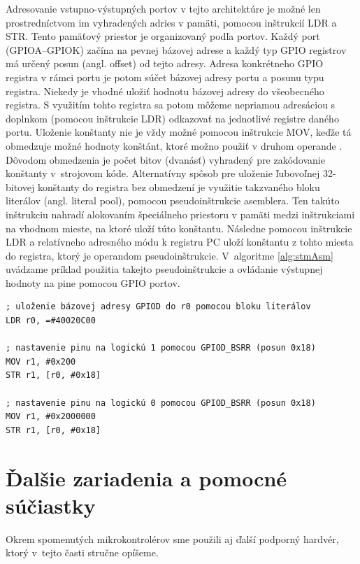 Adresovanie vstupno-výstupných portov v tejto architektúre je možné len prostredníctvom im vyhradených adries v pamäti, pomocou inštrukcií LDR a STR. Tento pamäťový priestor je organizovaný podľa portov. Každý port (GPIOA--GPIOK) začína na pevnej bázovej adrese a každý typ GPIO registrov má určený posun (angl. offset) od tejto adresy. Adresa konkrétneho GPIO registra v rámci portu je potom súčet bázovej adresy portu a posunu typu registra. Niekedy je vhodné uložiť hodnotu bázovej adresy do všeobecného registra. S využitím tohto registra sa potom môžeme nepriamou adresáciou s doplnkom (pomocou inštrukcie LDR) odkazovať na jednotlivé registre daného portu. Uloženie konštanty nie je vždy možné pomocou inštrukcie MOV, keďže tá obmedzuje možné hodnoty konštánt, ktoré možno použiť v druhom operande \cite{stmInstruction}. Dôvodom obmedzenia je počet bitov (dvanásť) vyhradený pre zakódovanie konštanty v~strojovom kóde. Alternatívny spôsob pre uloženie ľubovoľnej 32-bitovej konštanty do registra bez obmedzení je využitie takzvaného bloku literálov (angl. literal pool), pomocou pseudoinštrukcie asemblera. Ten takúto inštrukciu nahradí alokovaním špeciálneho priestoru v pamäti medzi inštrukciami na vhodnom mieste, na ktoré uloží túto konštantu. Následne pomocou inštrukcie LDR a relatívneho adresného módu k registru PC uloží konštantu z tohto miesta do registra, ktorý je operandom pseudoinštrukcie. V~algoritme \ref{alg:stmAsm} uvádzame príklad použitia takejto pseudoinštrukcie a ovládanie výstupnej hodnoty na pine pomocou GPIO portov.

\begin{lstlisting}[float,language=AVR,caption={Nastavenie hodnoty výstupného pinu GPIOD 9 na STM32F407 v jazyku asembler. Pre uloženie bázovej adresy portu GPIOD použijeme blok literálov.}, label=alg:stmAsm]
; uloženie bázovej adresy GPIOD do r0 pomocou bloku literálov
LDR r0, =#40020C00

; nastavenie pinu na logickú 1 pomocou GPIOD_BSRR (posun 0x18)
MOV r1, #0x200 
STR r1, [r0, #0x18] 

; nastavenie pinu na logickú 0 pomocou GPIOD_BSRR (posun 0x18)
MOV r1, #0x2000000
STR r1, [r0, #0x18]
\end{lstlisting}

\section{Ďalšie zariadenia a pomocné súčiastky} \label{kap2:sek:dalsieZariadenia}
Okrem spomenutých mikrokontrolérov sme použili aj ďalší podporný hardvér, ktorý v~tejto časti stručne opíšeme.

